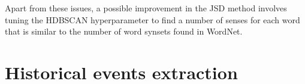\documentclass[runningheads]{llncs}
\begin{document}
Apart from these issues, a possible improvement in the JSD method involves tuning the HDBSCAN hyperparameter to find a number of senses for each word that is similar to the number of word synsets found in WordNet.

\section{Historical events extraction}
\label{sec:historical_events}



\end{document}
